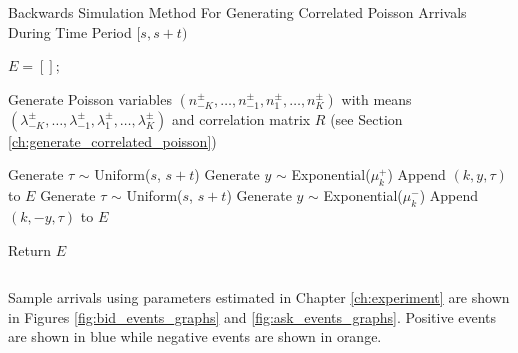 \begin{algorithm}[H]
\label{alg:backwards_simulation}
\SetAlgoLined
\caption{Backwards Simulation Method For Generating Correlated Poisson Arrivals During Time Period $[s, s+t)$}
 $E = []$;

 Generate Poisson variables $(n^{\pm}_{-K}, \ldots, n^{\pm}_{-1}, n^{\pm}_1, \ldots, n^{\pm}_K)$ with means $(\lambda^{\pm}_{-K}, \ldots, \lambda^{\pm}_{-1}, \lambda^{\pm}_1, \ldots, \lambda^{\pm}_K)$ and correlation matrix $R$ (see Section \ref{ch:generate_correlated_poisson}) \;
 
  {
     {
        Generate $\tau$ $\sim$ Uniform($s$, $s+t$) \;
        Generate $y$ $\sim$ Exponential($\mu^+_k$) \;
        Append $(k,y,\tau)$ to $E$ \;
    }
     {
        Generate $\tau$ $\sim$ Uniform($s$, $s+t$) \;
        Generate $y$ $\sim$ Exponential($\mu^-_k$) \;
        Append $(k,-y,\tau)$ to $E$ \;
    }
 }
 
 Return $E$ \;
 
\end{algorithm}

$$ $$

Sample arrivals using parameters estimated in Chapter \ref{ch:experiment} are shown in Figures \ref{fig:bid_events_graphs} and \ref{fig:ask_events_graphs}. Positive events are shown in blue while negative events are shown in orange.

